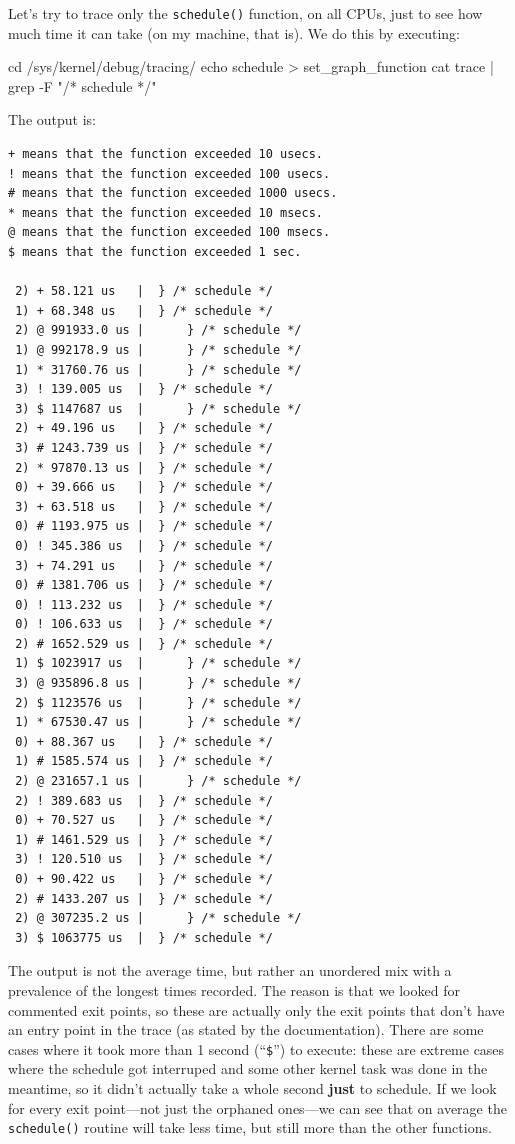Let's try to trace only the \verb|schedule()| function, on all CPUs, just to see how much time it can take (on my machine, that is). We do this by executing: 
\begin{codebash}
cd /sys/kernel/debug/tracing/
echo schedule > set_graph_function
cat trace | grep -F "/* schedule */"
\end{codebash}
The output is:
\begin{Verbatim}
+ means that the function exceeded 10 usecs.
! means that the function exceeded 100 usecs.
# means that the function exceeded 1000 usecs.
* means that the function exceeded 10 msecs.
@ means that the function exceeded 100 msecs.
$ means that the function exceeded 1 sec.

 2) + 58.121 us   |  } /* schedule */
 1) + 68.348 us   |  } /* schedule */
 2) @ 991933.0 us |      } /* schedule */
 1) @ 992178.9 us |      } /* schedule */
 1) * 31760.76 us |      } /* schedule */
 3) ! 139.005 us  |  } /* schedule */
 3) $ 1147687 us  |      } /* schedule */
 2) + 49.196 us   |  } /* schedule */
 3) # 1243.739 us |  } /* schedule */
 2) * 97870.13 us |  } /* schedule */
 0) + 39.666 us   |  } /* schedule */
 3) + 63.518 us   |  } /* schedule */
 0) # 1193.975 us |  } /* schedule */
 0) ! 345.386 us  |  } /* schedule */
 3) + 74.291 us   |  } /* schedule */
 0) # 1381.706 us |  } /* schedule */
 0) ! 113.232 us  |  } /* schedule */
 0) ! 106.633 us  |  } /* schedule */
 2) # 1652.529 us |  } /* schedule */
 1) $ 1023917 us  |      } /* schedule */
 3) @ 935896.8 us |      } /* schedule */
 2) $ 1123576 us  |      } /* schedule */
 1) * 67530.47 us |      } /* schedule */
 0) + 88.367 us   |  } /* schedule */
 1) # 1585.574 us |  } /* schedule */
 2) @ 231657.1 us |      } /* schedule */
 2) ! 389.683 us  |  } /* schedule */
 0) + 70.527 us   |  } /* schedule */
 1) # 1461.529 us |  } /* schedule */
 3) ! 120.510 us  |  } /* schedule */
 0) + 90.422 us   |  } /* schedule */
 2) # 1433.207 us |  } /* schedule */
 2) @ 307235.2 us |      } /* schedule */
 3) $ 1063775 us  |  } /* schedule */
\end{Verbatim}
The output is not the average time, but rather an unordered mix with a prevalence of the longest times recorded. The reason is that we looked for commented exit points, so these are actually only the exit points that don't have an entry point in the trace (as stated by the documentation). There are some cases where it took more than 1 second (``\verb|$|'') to execute: these are extreme cases where the schedule got interruped and some other kernel task was done in the meantime, so it didn't actually take a whole second \textbf{just} to schedule. If we look for every exit point---not just the orphaned ones---we can see that on average the \verb|schedule()| routine will take less time, but still more than the other functions.


